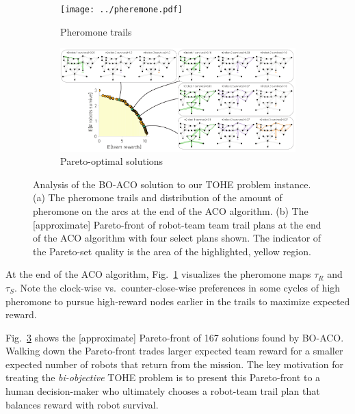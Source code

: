 \documentclass[11pt, oneside]{article}
\begin{document}
\begin{figure}[h!]
    \centering
    \begin{subfigure}[b]{0.59\textwidth}
    	\texttt{[image: ../pheremone.pdf]}
	\caption{Pheromone trails} \label{fig:pheromone}
    \end{subfigure}
        \begin{subfigure}[b]{\textwidth}
    	\includegraphics[width=\textwidth]{drawings/real_pareto_front.pdf}
	\caption{Pareto-optimal solutions} \label{fig:pareto_front}
    \end{subfigure}
    \caption{Analysis of the BO-ACO solution to our TOHE problem instance. 
    (a) The pheromone trails and distribution of the amount of pheromone on the arcs at the end of the ACO algorithm. 
    (b) The [approximate] Pareto-front of robot-team team trail plans at the end of the ACO algorithm with four select plans shown. The indicator of the Pareto-set quality is the area of the highlighted, yellow region.
    }
\end{figure}

At the end of the ACO algorithm, Fig.~\ref{fig:pheromone} visualizes the pheromone maps $\tau_{R}$ and $\tau_S$.
 Note the clock-wise vs.\ counter-close-wise preferences in some cycles of high pheromone to pursue high-reward nodes earlier in the trails to maximize expected reward.
 
 

Fig.~\ref{fig:pareto_front} shows the [approximate] Pareto-front of 167 solutions found by BO-ACO. 
Walking down the Pareto-front trades larger expected team reward for a smaller expected number of robots that return from the mission. The key motivation for treating the \emph{bi-objective} TOHE problem is to present this Pareto-front to a human decision-maker who ultimately chooses a robot-team trail plan that balances reward with robot survival.
\end{document}
